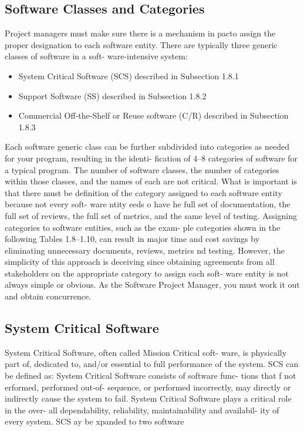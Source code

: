 \documentclass{book}
\begin{document}
\begin{multicols}{2}
\section{Software Classes and Categories}
Project managers must make sure there is a mechanism in
pacto assign the proper designation to each software entity.
There are typically three generic classes of software in a soft-
ware-intensive system:
\begin{itemize}
	\renewcommand{\labelitemi}{\scriptsize$\blacksquare$}
	\item System Critical Software (SCS) described in Subsection
	1.8.1
	\item Support Software (SS) described in Subsection 1.8.2
	\item Commercial Off-the-Shelf or Reuse software (C/R)
	described in Subsection 1.8.3
\end{itemize}
Each software generic class can be further subdivided into
categories as needed for your program, resulting in the identi-
fication of 4–8 categories of software for a typical program.
The number of software classes, the number of categories
within those classes, and the names of each are not critical.
What is important is that there must be definition of the
category assigned to each software entity because not every soft-
ware ntity eeds o have he full set of documentation, the full
set of reviews, the full set of metrics, and the same level of testing.
Assigning categories to software entities, such as the exam-
ple categories shown in the following Tables 1.8–1.10, can
result in major time and cost savings by eliminating unnecessary
documents, reviews, metrics nd testing. However, the simplicity
of this approach is deceiving since obtaining agreements from
all stakeholders on the appropriate category to assign each soft-
ware entity is not always simple or obvious. As the Software
Project Manager, you must work it out and obtain concurrence.

\subsection{System Critical Software}
System Critical Software, often called Mission Critical soft-
ware, is physically part of, dedicated to, and/or essential to full
performance of the system. SCS can be defined as:
System Critical Software consists of software func-
tions that f not erformed, performed out-of-
sequence, or performed incorrectly, may directly or
indirectly cause the system to fail.
System Critical Software plays a critical role in the over-
all dependability, reliability, maintainability and availabil-
ity of every system. SCS ay be xpanded to two software
\end{multicols}
\end{document}
